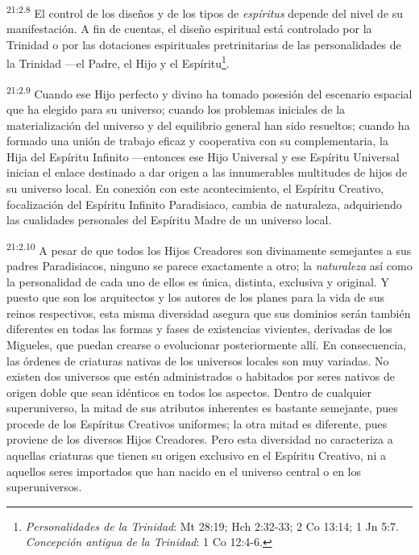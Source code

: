 \par
\textsuperscript{21:2.8} El control de los diseños y de los tipos de \textit{espíritus} depende del nivel de su manifestación. A fin de cuentas, el diseño espiritual está controlado por la Trinidad o por las dotaciones espirituales pretrinitarias de las personalidades de la Trinidad ---el Padre, el Hijo y el Espíritu\footnote{\textit{Personalidades de la Trinidad}: Mt 28:19; Hch 2:32-33; 2 Co 13:14; 1 Jn 5:7. \textit{Concepción antigua de la Trinidad}: 1 Co 12:4-6.}.

\par
\textsuperscript{21:2.9} Cuando ese Hijo perfecto y divino ha tomado posesión del escenario espacial que ha elegido para su universo; cuando los problemas iniciales de la materialización del universo y del equilibrio general han sido resueltos; cuando ha formado una unión de trabajo eficaz y cooperativa con su complementaria, la Hija del Espíritu Infinito ---entonces ese Hijo Universal y ese Espíritu Universal inician el enlace destinado a dar origen a las innumerables multitudes de hijos de su universo local. En conexión con este acontecimiento, el Espíritu Creativo, focalización del Espíritu Infinito Paradisiaco, cambia de naturaleza, adquiriendo las cualidades personales del Espíritu Madre de un universo local.

\par
\textsuperscript{21:2.10} A pesar de que todos los Hijos Creadores son divinamente semejantes a sus padres Paradisiacos, ninguno se parece exactamente a otro; la \textit{naturaleza} así como la personalidad de cada uno de ellos es única, distinta, exclusiva y original. Y puesto que son los arquitectos y los autores de los planes para la vida de sus reinos respectivos, esta misma diversidad asegura que sus dominios serán también diferentes en todas las formas y fases de existencias vivientes, derivadas de los Migueles, que puedan crearse o evolucionar posteriormente allí. En consecuencia, las órdenes de criaturas nativas de los universos locales son muy variadas. No existen dos universos que estén administrados o habitados por seres nativos de origen doble que sean idénticos en todos los aspectos. Dentro de cualquier superuniverso, la mitad de sus atributos inherentes es bastante semejante, pues procede de los Espíritus Creativos uniformes; la otra mitad es diferente, pues proviene de los diversos Hijos Creadores. Pero esta diversidad no caracteriza a aquellas criaturas que tienen su origen exclusivo en el Espíritu Creativo, ni a aquellos seres importados que han nacido en el universo central o en los superuniversos.

